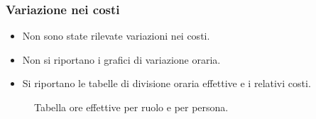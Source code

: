 \pagebreak
\subsubsection{Variazione nei costi}
\begin{itemize}

\item Non sono state rilevate variazioni nei costi.

\item Non si riportano i grafici di variazione oraria.

\item Si riportano le tabelle di divisione oraria effettive e i relativi costi.

\end{itemize}
\begin{figure}[H]
\label{tab:car}
\caption{Tabella ore effettive {\ARI} per ruolo e per persona.}

\end{figure}



